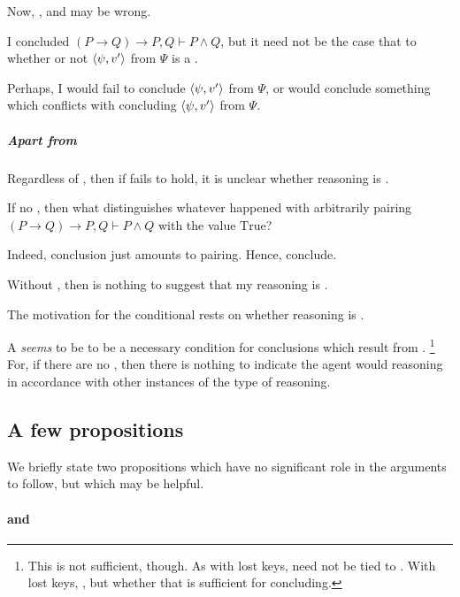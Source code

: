 \begin{note}
  Now, , and  may be wrong.

  I concluded \((P \rightarrow Q) \rightarrow P, Q \vdash P \land Q\), but it need not be the case that  to whether or not \(\langle \psi, v' \rangle\) from \(\Psi\) is a \fc{}.

  Perhaps, I would fail to conclude \(\langle \psi, v' \rangle\) from \(\Psi\), or would conclude something which conflicts with concluding \(\langle \psi, v' \rangle\) from \(\Psi\).
\end{note}

\subparagraph{Apart from }

\begin{note}
  Regardless of , then if \requ{} fails to hold, it is unclear whether reasoning is \tR{}.

  If no \requ{}, then what distinguishes whatever happened with arbitrarily pairing \((P \rightarrow Q) \rightarrow P, Q \vdash P \land Q\) with the value \(\text{True}\)?

  Indeed, conclusion just amounts to pairing.
  Hence, conclude.

  Without , then is nothing to suggest that my reasoning is \tR{}.
\end{note}

\begin{note}
  The motivation for the conditional rests on whether reasoning is \tR{}.

  A \requ{} \emph{seems} to be to be a necessary condition for conclusions which result from \tR{}.%
  \footnote{
    This is not sufficient, though.
    As with lost keys, \requ{} need not be tied to \tR{}.
    With lost keys, \tR{}, but whether that is sufficient for concluding.
  }
  For, if there are no , then there is nothing to indicate the agent would reasoning in accordance with other instances of the type of reasoning.
\end{note}

\subsection{A few propositions}
\label{sec:propsoitions}

\begin{note}
  We briefly state two propositions which have no significant role in the arguments to follow, but which may be helpful.
\end{note}

\paragraph*{ and \issueConstraint{}}

